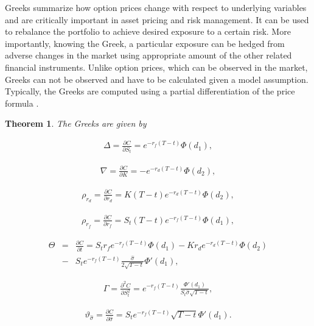 \documentclass[a4paper,11pt]{amsart}
\numberwithin{equation}{section}
\theoremstyle{definition}
\theoremstyle{plain}
\newtheorem{thm}{Theorem}[section]
\theoremstyle{definition}
\newcommand{\1}{\mathbf{1}}
\begin{document}
Greeks summarize how option prices change with respect to underlying variables
and are critically important in asset pricing and risk management. It can be
used to rebalance the portfolio to achieve desired exposure to a certain risk. More
importantly, knowing the Greek, a particular exposure can be hedged from adverse
changes in the market using appropriate amount of the other related financial
instruments. Unlike option prices, which can be observed in the market, Greeks can
not be observed and have to be calculated given a model assumption. Typically, the
Greeks are computed using a partial differentiation of the price formula \cite{higham,cvitanic,lyuu,shokrollahi3}.

\begin{thm} The Greeks are given by


\begin{eqnarray}
 \Delta=\frac{\partial C}{\partial S_t}=e^{-r_f(T-t)}\Phi(d_1),
 \label{eq:12}
\end{eqnarray}

\begin{eqnarray}
 \nabla=\frac{\partial C}{\partial K}=-e^{-r_d(T-t)}\Phi(d_2),
 \label{eq:13}
\end{eqnarray}


\begin{eqnarray}
 \rho_{r_d}=\frac{\partial C}{\partial r_d}=K(T-t)e^{-r_d(T-t)}\Phi(d_2),
\label{eq:14}
\end{eqnarray}

\begin{eqnarray}
 \rho_{r_f}=\frac{\partial C}{\partial r_f}=S_t(T-t)e^{-r_f(T-t)}\Phi(d_1),
 \label{eq:15}
\end{eqnarray}

\begin{eqnarray}
 \Theta&=&\frac{\partial C}{\partial t}=S_tr_fe^{-r_f(T-t)}\Phi(d_1)-Kr_de^{-r_d(T-t)}\Phi(d_2)\nonumber\\
 &-&S_te^{-r_f(T-t)}\frac{\widehat{\sigma}}{2\sqrt{T-t}}\Phi'(d_1),
 \label{eq:16}
\end{eqnarray}

\begin{eqnarray}
\Gamma=\frac{\partial^2 C}{\partial S_t^2}=e^{-r_f(T-t)}\frac{\Phi'(d_1)}{S_t\widehat{\sigma}\sqrt{T-t}},
\label{eq:17}
\end{eqnarray}

\begin{eqnarray}
\vartheta_{\widehat{\sigma}}=\frac{\partial C}{\partial \widehat{\sigma}}=S_te^{-r_f(T-t)}\sqrt{T-t}\Phi'(d_1).
\label{eq:18}
\end{eqnarray}
\label{p:3}
\end{thm}
\end{document}
